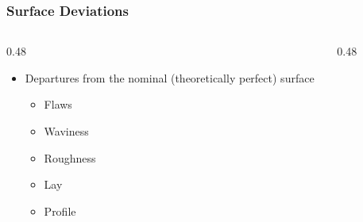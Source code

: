 \begin{frame}
	\frametitle{Surface Deviations}

    \begin{columns}
        \begin{column}{0.48\linewidth}
            \begin{itemize}[<+- | alert@+>]
                \item{Departures from the nominal (theoretically perfect) surface}
                    \begin{itemize}
                        \item{Flaws}
                        \item{Waviness}
                        \item{Roughness}
                        \item{Lay}
                        \item{Profile}
                    \end{itemize}
            \end{itemize}
        \end{column}
        \begin{column}{0.48\linewidth}
            \begin{figure}
                \centering
                \resizebox{\linewidth}{!}{
                    
                }
            \end{figure}
        \end{column}
    \end{columns}
\end{frame}

